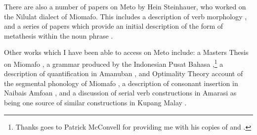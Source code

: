 There are also a number of papers on Meto by Hein Steinhauer,
who worked on the Nilulat dialect of Miomafo.
This includes a description of verb morphology \citep{st93},
and a series of papers which provide an initial
description of the form of metathesis within the noun phrase
\citep{st96,st96b,st08}.

Other works which I have been able to access
on Meto include: a Masters Thesis on Miomafo \citep{ta88},
a grammar produced by the Indonesian Pusat Bahasa \citep{ta89},\footnote{
		Thanks goes to Patrick McConvell for providing me
		with his copies of \citet{ta88} and \citet{ta89}.}
a description of quantification in Amanuban \citep{mebe14},
and Optimality Theory account of the segmental phonology of Miomafo \citep{is13},
a description of consonant insertion in Nai{\Q}bais Amfo{\Q}an \citep{cu18},
and a discussion of serial verb constructions in Amarasi
as being one source of similar constructions in Kupang Malay \citep{jagr11}.
